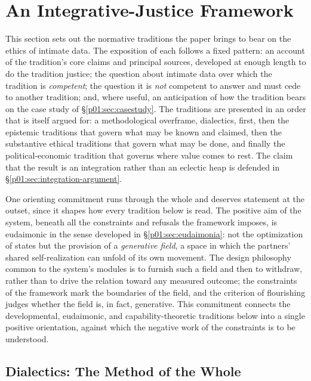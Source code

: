 \section{An Integrative-Justice Framework}\label{p01:sec:frameworks}

This section sets out the normative traditions the paper brings to bear on the ethics of intimate data. The exposition of each follows a fixed pattern: an account of the tradition's core claims and principal sources, developed at enough length to do the tradition justice; the question about intimate data over which the tradition is \emph{competent}; the question it is \emph{not} competent to answer and must cede to another tradition; and, where useful, an anticipation of how the tradition bears on the case study of §\ref{p01:sec:casestudy}. The traditions are presented in an order that is itself argued for: a methodological overframe, dialectics, first, then the epistemic traditions that govern what may be known and claimed, then the substantive ethical traditions that govern what may be done, and finally the political-economic tradition that governs where value comes to rest. The claim that the result is an integration rather than an eclectic heap is defended in §\ref{p01:sec:integration-argument}.

One orienting commitment runs through the whole and deserves statement at the outset, since it shapes how every tradition below is read. The positive aim of the system, beneath all the constraints and refusals the framework imposes, is eudaimonic in the sense developed in §\ref{p01:sec:eudaimonia}: not the optimization of states but the provision of a \emph{generative field}, a space in which the partners' shared self-realization can unfold of its own movement. The design philosophy common to the system's modules is to furnish such a field and then to withdraw, rather than to drive the relation toward any measured outcome; the constraints of the framework mark the boundaries of the field, and the criterion of flourishing judges whether the field is, in fact, generative. This commitment connects the developmental, eudaimonic, and capability-theoretic traditions below into a single positive orientation, against which the negative work of the constraints is to be understood.

\subsection{Dialectics: The Method of the Whole}\label{p01:sec:dialectics}

